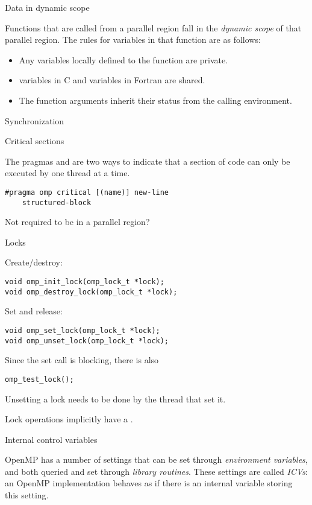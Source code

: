  {Data in dynamic scope}

Functions that are called from a parallel region fall in the
\emph{dynamic scope} of that
parallel region. The rules for variables in that function are as follows:
\begin{itemize}
\item Any variables locally defined to the function are private.
\item {} variables in C and  variables in Fortran
  are shared.
\item The function arguments inherit their status from the calling environment.
\end{itemize}

 {Synchronization}

 {Critical sections}

The pragmas  and 
are two ways to indicate that a section of code can only be executed
by one thread at a time.

\begin{verbatim}
#pragma omp critical [(name)] new-line
    structured-block
\end{verbatim}

Not required to be in a parallel region?

 {Locks}
\label{ompref:locks}

Create/destroy:
\begin{verbatim}
void omp_init_lock(omp_lock_t *lock);
void omp_destroy_lock(omp_lock_t *lock);
\end{verbatim}
Set and release:
\begin{verbatim}
void omp_set_lock(omp_lock_t *lock);
void omp_unset_lock(omp_lock_t *lock);
\end{verbatim}
Since the set call is blocking, there is also 
\begin{verbatim}
omp_test_lock();
\end{verbatim}

Unsetting a lock needs to be done by the thread that set it.

Lock operations implicitly have a .

 {Internal control variables}
\label{ref:omp-environ}

OpenMP has a number of settings that can be set through \emph{environment variables},
and both queried and set through \emph{library routines}. These settings are called
\emph{\acfp{ICV}}: an OpenMP implementation behaves as if there is an internal variable
storing this setting.

